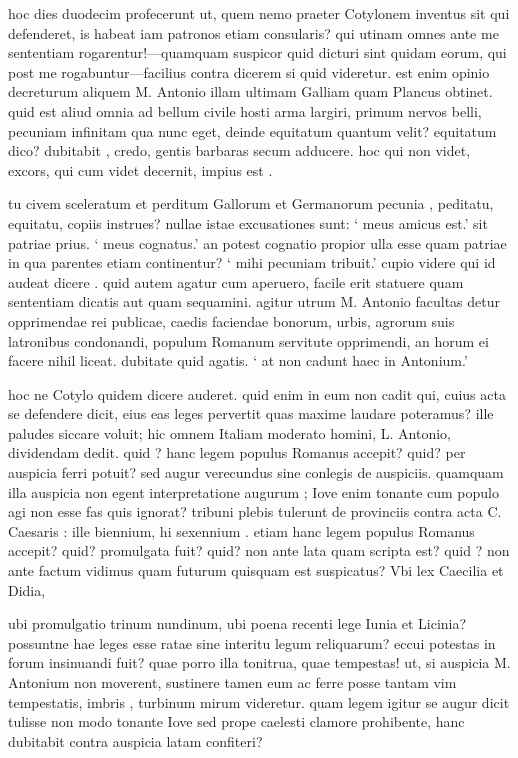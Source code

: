 hoc dies duodecim profecerunt ut, quem nemo praeter Cotylonem inventus sit qui defenderet, is habeat iam patronos etiam consularis? qui utinam omnes ante me sententiam rogarentur!—quamquam suspicor quid dicturi sint quidam eorum, qui post me rogabuntur—facilius contra dicerem si quid videretur. est enim opinio decreturum aliquem M. Antonio illam ultimam Galliam quam Plancus obtinet. quid est aliud omnia ad bellum civile hosti arma largiri, primum nervos belli, pecuniam infinitam qua nunc eget, deinde equitatum quantum velit? equitatum dico? dubitabit , credo, gentis barbaras secum adducere. hoc qui non videt, excors, qui cum videt decernit, impius est .

 tu civem sceleratum et perditum Gallorum et Germanorum pecunia , peditatu, equitatu, copiis instrues? nullae istae excusationes sunt: ` meus amicus est.' sit patriae prius. ` meus cognatus.' an potest cognatio propior ulla esse quam patriae in qua parentes etiam continentur? ` mihi pecuniam tribuit.' cupio videre qui id audeat dicere . quid autem agatur cum aperuero, facile erit statuere quam sententiam dicatis aut quam sequamini. agitur utrum M. Antonio facultas detur opprimendae rei publicae, caedis faciendae bonorum, urbis, agrorum suis latronibus condonandi, populum Romanum servitute opprimendi, an horum ei facere nihil liceat. dubitate quid agatis. ` at non cadunt haec in Antonium.'

 hoc ne Cotylo quidem dicere auderet. quid enim in eum non cadit qui, cuius acta se defendere dicit, eius eas leges pervertit quas maxime laudare poteramus? ille paludes siccare voluit; hic omnem Italiam moderato homini, L. Antonio, dividendam dedit. quid ? hanc legem populus Romanus accepit? quid? per auspicia ferri potuit? sed augur verecundus sine conlegis de auspiciis. quamquam illa auspicia non egent interpretatione augurum ; Iove enim tonante cum populo agi non esse fas quis ignorat? tribuni plebis tulerunt de provinciis contra acta C. Caesaris : ille biennium, hi sexennium . etiam hanc legem populus Romanus accepit? quid? promulgata fuit? quid? non ante lata quam scripta est? quid ? non ante factum vidimus quam futurum quisquam est suspicatus? Vbi lex Caecilia et Didia,

 ubi promulgatio trinum nundinum, ubi poena recenti lege Iunia et Licinia? possuntne hae leges esse ratae sine interitu legum reliquarum? eccui potestas in forum insinuandi fuit? quae porro illa tonitrua, quae tempestas! ut, si auspicia M. Antonium non moverent, sustinere tamen eum ac ferre posse tantam vim tempestatis, imbris , turbinum mirum videretur. quam legem igitur se augur dicit tulisse non modo tonante Iove sed prope caelesti clamore prohibente, hanc dubitabit contra auspicia latam confiteri?

